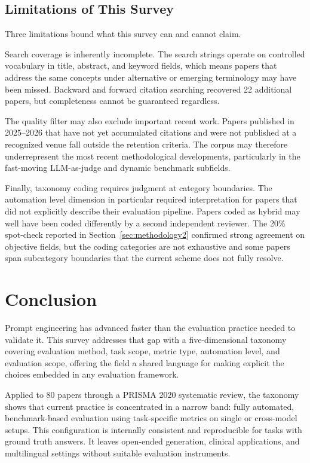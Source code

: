 \documentclass[journal]{IEEEtran}
\begin{document}
\subsection{Limitations of This Survey}

Three limitations bound what this survey can and cannot claim.

Search coverage is inherently incomplete. The search strings operate
on controlled vocabulary in title, abstract, and keyword fields, which means
papers that address the same concepts under alternative or emerging terminology
may have been missed. Backward and forward citation searching
recovered 22 additional papers, but completeness cannot be guaranteed regardless.

The quality filter may also exclude important recent work. Papers published
in 2025--2026 that have not yet accumulated citations and were not
published at a recognized venue fall outside the retention criteria.
The corpus may therefore underrepresent the most recent methodological
developments, particularly in the fast-moving LLM-as-judge and dynamic
benchmark subfields.

Finally, taxonomy coding requires judgment at category boundaries. The
automation level dimension in particular required interpretation
for papers that did not explicitly describe their evaluation pipeline.
Papers coded as hybrid may well have been coded differently by a second
independent reviewer. The 20\% spot-check reported in Section~\ref{sec:methodology2}
confirmed strong agreement on objective fields, but the coding
categories are not exhaustive and some papers span subcategory
boundaries that the current scheme does not fully resolve.


\section{Conclusion}
\label{sec:conclusion}

Prompt engineering has advanced faster than the evaluation practice needed to validate it. This
survey addresses that gap with a five-dimensional taxonomy covering
evaluation method, task scope, metric type, automation level, and
evaluation scope, offering the field a shared language for making
explicit the choices embedded in any evaluation framework.

Applied to 80 papers through a PRISMA 2020 systematic review, the
taxonomy shows that current practice is concentrated in a narrow
band: fully automated, benchmark-based evaluation using task-specific
metrics on single or cross-model setups. This configuration is
internally consistent and reproducible for tasks with ground truth
answers. It leaves open-ended generation, clinical applications, and
multilingual settings without suitable evaluation instruments.
\end{document}

